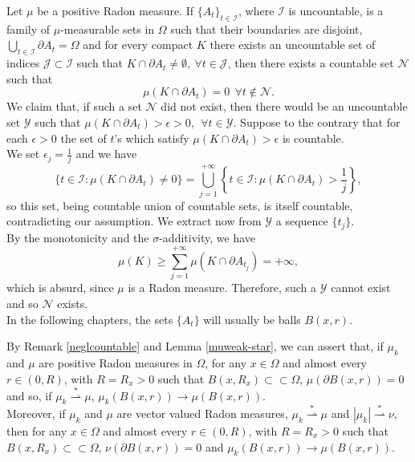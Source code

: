 \begin{remark} \label{neglcountable} Let $\mu$ be a positive Radon measure. If $\{A_{t}\}_{t \in \mathcal{I}}$, where $\mathcal{I}$ is uncountable, is a family of $\mu$-measurable sets in $\Omega$ such that their boundaries are disjoint, $\bigcup_{t \in \mathcal{I}} \partial A_{t} = \Omega$ and for every compact $K$ there exists an uncountable set of indices $\mathcal{J} \subset \mathcal{I}$ such that $K \cap \partial A_{t} \neq \emptyset, \ \forall t \in \mathcal{J}$, then there exists a countable set $\mathcal{N}$ such that
\[ \mu(K \cap \partial A_{t}) = 0 \  \ \forall t \notin \mathcal{N}. \]
We claim that, if such a set $\mathcal{N}$ did not exist, then there would be an uncountable set $\mathcal{Y}$ such that $\mu(K \cap \partial A_{t}) > \epsilon > 0, \  \ \forall t \in \mathcal{Y}$.
Suppose to the contrary that for each $\epsilon > 0$ the set of $t$'s which satisfy $\mu(K \cap \partial A_{t}) > \epsilon$ is countable. 
\\
We set $\epsilon_{j} = \frac{1}{j}$ and we have 
\[ \{ t \in \mathcal{I} : \mu(K \cap \partial A_{t}) \neq 0 \} = \bigcup_{j=1}^{+\infty} \left \{ t \in \mathcal{I}: \mu(K \cap \partial A_{t}) > \frac{1}{j} \right \}, \]
so this set, being countable union of countable sets, is itself countable, contradicting our assumption.
We extract now from $\mathcal{Y}$ a sequence $\{t_{j}\}$.
\\
By the monotonicity and the $\sigma$-additivity, we have
\[ \mu(K) \ge \sum_{j = 1}^{+\infty} \mu(K \cap \partial A_{t_{j}}) = +\infty, \]
which is absurd, since $\mu$ is a Radon measure. Therefore, such a $\mathcal{Y}$ cannot exist and so $\mathcal{N}$ exists.
\\
In the following chapters, the sets $\{A_{t}\}$ will usually be balls $B(x,r)$.
\end{remark}

\begin{remark} By Remark \ref{neglcountable} and Lemma \ref{muweak-star}, we can assert that, if $\mu_{k}$ and $\mu$ are positive Radon measures in $\Omega$, for any $x \in \Omega$ and almost every $r \in (0, R)$, with $R = R_{x} > 0$ such that $B(x, R_{x}) \subset \subset \Omega$, $\mu(\partial B(x,r)) = 0$ and so, if $\mu_{k} \stackrel {*} {\rightharpoonup} \mu$, $\mu_{k}(B(x,r)) \to \mu(B(x,r))$. 
\\
Moreover, if $\mu_{k}$ and $\mu$ are vector valued Radon measures, $\mu_{k} \stackrel {*}{\rightharpoonup} \mu$ and $|\mu_{k}| \stackrel {*} {\rightharpoonup} \nu$, then for any $x \in \Omega$ and almost every $r \in (0, R)$, with $R = R_{x} > 0$ such that $B(x, R_{x}) \subset \subset \Omega$, $\nu(\partial B(x,r)) = 0$ and $\mu_{k}(B(x,r)) \to \mu(B(x,r))$.
\end{remark}

